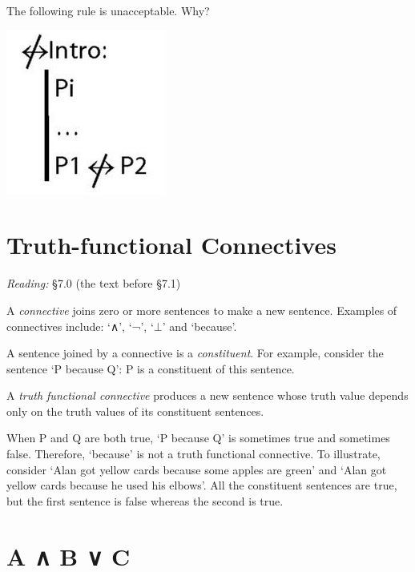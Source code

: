 \documentclass[12pt]{extarticle}
\begin{document}
\begin{multicols*}{3}
\begin{minipage}{\columnwidth}
 
The following rule is unacceptable. Why?
 
\begin{center}
\includegraphics[scale=0.3]{img/rule_not_equivalent_intro_wrong.png}
\end{center}
\end{minipage}
 
 
 
\section{Truth-functional Connectives}
 
\emph{Reading:} §7.0 (the text before §7.1)
 
A \emph{connective} joins zero or more sentences to make a new sentence. Examples of connectives include: `∧', `¬', `$\bot$' and `because'.
 
A sentence joined by a connective is a \emph{constituent}. For example, consider the sentence ‘P because Q’: P is a constituent of this sentence.
 
A \emph{truth functional connective} produces a new sentence whose truth value depends only on the truth values of its constituent sentences.
 
When P and Q are both true, ‘P because Q’ is sometimes true and sometimes false. Therefore, ‘because’ is not a truth functional connective. To illustrate, consider `Alan got yellow cards because some apples are green' and `Alan got yellow cards because he used his elbows'. All the constituent sentences are true, but the first sentence is false whereas the second is true.
 
 
 
\section{A ∧ B ∨ C}
 

\end{multicols*}
\end{document}
